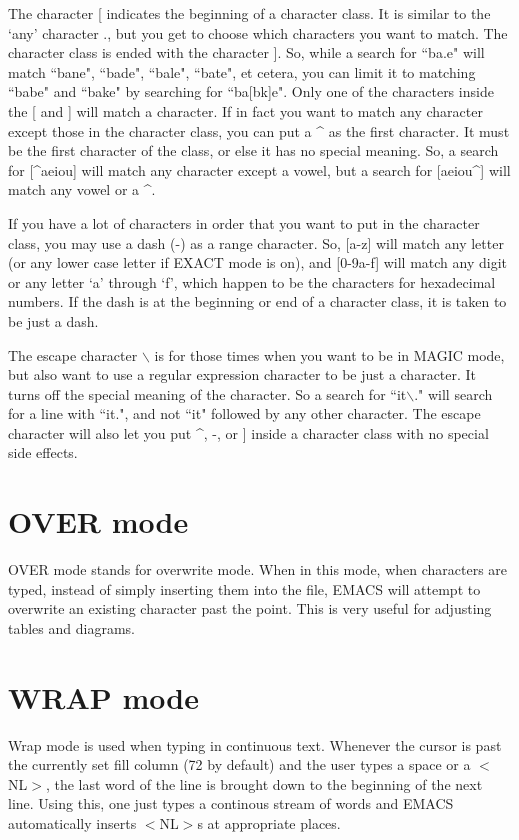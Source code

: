      The character [ indicates the beginning of a character class.  It
is similar to the `any' character ., but you get to choose which
characters you want to match.  The character class is ended with the
character ].  So, while a search for ``ba.e" will match ``bane", ``bade",
``bale", ``bate", et cetera, you can limit it to matching ``babe" and
``bake" by searching for ``ba[bk]e".  Only one of the characters inside
the [ and ] will match a character.  If in fact you want to match any
character except those in the character class, you can put a \^{} as the
first character.  It must be the first character of the class, or else
it has no special meaning.  So, a search for [\^{}aeiou] will match any
character except a vowel, but a search for [aeiou\^{}] will match any vowel
or a \^{}.

If you have a lot of characters in order that you want to put in the
character class, you may use a dash (-) as a range character.  So, [a-z]
will match any letter (or any lower case letter if EXACT mode is on),
and [0-9a-f] will match any digit or any letter `a' through `f', which
happen to be the characters for hexadecimal numbers.  If the dash is at
the beginning or end of a character class, it is taken to be just a
dash.

     The escape character $\backslash${} is for those times when you
want to be in MAGIC mode, but also want to use a regular expression
character to be just a character.  It turns off the special meaning of
the character.  So a search for ``it$\backslash${}." will search for a
line with ``it.", and not ``it" followed by any other character.  The
escape character will also let you put \^{}, -, or ] inside a
character class with no special side effects.

\section{OVER mode}

OVER mode stands for overwrite mode.  When in this mode, when
characters are typed, instead of simply inserting them into the file,
EMACS will attempt to overwrite an existing character past the point.
This is very useful for adjusting tables and diagrams.

\section{WRAP mode}

Wrap mode is used when typing in continuous text.  Whenever the cursor
is past the currently set fill column  (72 by
default) and the user types a space or a $<${}NL$>${}, the last word
of the line is brought down to the beginning of the next line.  Using
this, one just types a continous stream of words and EMACS
automatically inserts $<${}NL$>${}s at appropriate places.

